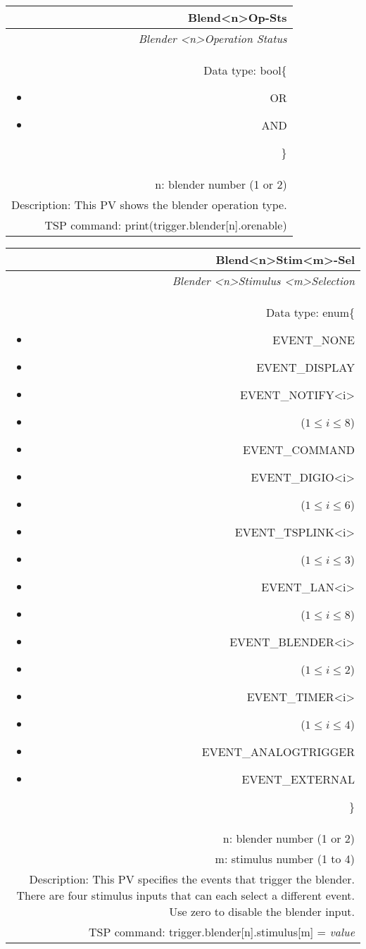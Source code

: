 \documentclass[openany]{article}
\begin{document}
		\begin{tabular}{N}
			\hline
			\bfseries Blend{\textless n\textgreater}Op-Sts\label{pv:blendop-sts} \\ \hline
			\emph{Blender \textless n\textgreater Operation Status} \\
			Data type: bool\{\begin{itemize}[noitemsep]
				\small
				\item[] OR
				\item[] AND
			\end{itemize}\} \\
			n: blender number (1 or 2) \\
			Description: This PV shows the blender operation type. \\
			TSP command: print(trigger.blender[n].orenable)
		\end{tabular}

		\begin{tabular}{N}
			\hline
			\bfseries Blend{\textless n\textgreater}Stim{\textless m\textgreater}-Sel\label{pv:blendstim-sel} \\ \hline
			\emph{Blender \textless n\textgreater Stimulus \textless m\textgreater Selection} \\
			Data type: enum\{\begin{itemize}[noitemsep]
				\small
				\item[] EVENT\_NONE
				\item[] EVENT\_DISPLAY
				\item[] EVENT\_NOTIFY\textless i\textgreater
				\item[] ($1\leq i\leq 8$)
				\item[] EVENT\_COMMAND
				\item[] EVENT\_DIGIO\textless i\textgreater
				\item[] ($1\leq i\leq 6$)
				\item[] EVENT\_TSPLINK\textless i\textgreater
				\item[] ($1\leq i\leq 3$)
				\item[] EVENT\_LAN\textless i\textgreater
				\item[] ($1\leq i\leq 8$)
				\item[] EVENT\_BLENDER\textless i\textgreater 
				\item[] ($1\leq i\leq 2$)
				\item[] EVENT\_TIMER\textless i\textgreater
				\item[] ($1\leq i\leq 4$)
				\item[] EVENT\_ANALOGTRIGGER
				\item[] EVENT\_EXTERNAL
			\end{itemize}\} \\
			n: blender number (1 or 2) \\
			m: stimulus number (1 to 4) \\
			Description: This PV specifies the events that trigger the blender. There are four stimulus inputs that can each select a different event. Use zero to disable the blender input. \\
			TSP command: trigger.blender[n].stimulus[m] = \emph{value}
		\end{tabular}
\end{document}
